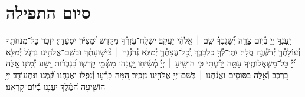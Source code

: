 \documentclass[twoside, openany, parskip=half, 11pt]{book}
\begin{document}
\negline
\kafdalet


\etzchaim




\nextpage

\section[סיום התפילה]{ סיום התפילה }
\label{ashrei}
\ashrei



יַֽעַנְךָ֣ יְיָ֭ בְּ֯י֣וֹם צָרָ֑ה יְ֯֝שַׂגֶּבְךָ֗ שֵׁ֤ם ׀ אֱלֹהֵ֬י יַעֲקֹֽב׃
יִשְׁלַֽח־עֶזְרְ֯ךָ֥ מִקֹּ֑דֶשׁ וּ֝מִצִּיּ֗וֹן יִסְעָדֶֽךָּ׃
יִזְכֹּ֥ר כׇּל־מִנְחֹתֶ֑ךָ וְ֯עוֹלָתְ֯ךָ֖ יְ֯דַשְּׁ֯נֶ֣ה סֶֽלָה׃
יִֽתֶּן־לְ֯ךָ֥ כִלְבָבֶ֑ךָ וְֽ֯כׇל־עֲצָתְ֯ךָ֥ יְ֯מַלֵּֽא׃
נְ֯רַנְּ֯נָ֤ה ׀ בִּ֘ישׁ֤וּעָתֶ֗ךָ וּבְשֵֽׁם־אֱלֹהֵ֥ינוּ נִדְגֹּ֑ל יְ֯מַלֵּ֥א יְ֝יָ֗ כׇּל־מִשְׁאֲלוֹתֶֽיךָ׃
עַתָּ֤ה יָדַ֗עְתִּי כִּ֤י הוֹשִׁ֥יעַ ׀ יְיָ֗ מְ֯שִׁ֫יח֥וֹ יַ֭עֲנֵהוּ מִשְּׁ֯מֵ֣י קׇדְשׁ֑וֹ בִּ֝גְבֻר֗וֹת יֵ֣שַׁע יְ֯מִינֽוֹ׃
אֵ֣לֶּה בָ֭רֶכֶב וְ֯אֵ֣לֶּה בַסּוּסִ֑ים וַאֲנַ֓חְנוּ ׀ בְּשֵׁם־יְיָ֖ אֱלֹהֵ֣ינוּ נַזְכִּֽיר׃
הֵ֭מָּה כָּרְ֯ע֣וּ וְ֯נָפָ֑לוּ וַאֲנַ֥חְנוּ קַּ֝֗מְנוּ וַנִּתְעוֹדָֽד׃
יְיָ֥ הוֹשִׁ֑יעָה הַ֝מֶּ֗לֶךְ יַעֲנֵ֥נוּ בְ֯יוֹם־קׇרְאֵֽנוּ׃
\end{document}
